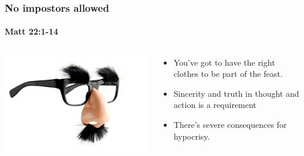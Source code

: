 \begin{frame}
\frametitle{No impostors allowed}
\framesubtitle{Matt 22:1-14}
\begin{columns}[T]
\begin{column}{0.4\textwidth}
\begin{center}
\includegraphics[width=\textwidth]{figures/imposter.jpg}
\end{center}
\end{column}
\begin{column}{0.6\textwidth}
\begin{itemize}
\item You've got to have the right clothes to be part of the feast.
\item Sincerity and truth in thought and action is a requirement
\item There's severe consequences for hypocrisy.
\end{itemize}
\end{column}
\end{columns}

\end{frame}

